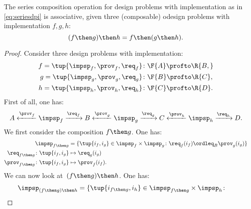 {    \begin{lemma}
        The series composition operation for design problems with implementation as in \cref{eq:seriesdpi} is associative, \ie  given three (composable) odesign problems with implementation $f,g,h$:
        \begin{equation}
        (f\then g)
            \then h = f\then (g\then h).
        \end{equation}
    \end{lemma}
    \begin{proof}
        Consider three design problems with implementation:
        \begin{equation}
            \begin{aligned}
                f=\tup{{\impsp_f, \prov_f, \req_f} }&\colon \F{A} \profto\R{B,}\\
                g=\tup{\impsp_g, \prov_g, \req_g}&\colon \F{B} \profto \R{C},\\
                h=\tup{\impsp_h, \prov_h, \req_h}&\colon \F{C} \profto \R{D}.
            \end{aligned}
        \end{equation}
        First of all, one has:
        \begin{equation}
            A \xleftarrow{\prov_f} \impsp_f \xrightarrow{\req_f} B
            \xleftarrow{\prov_g} \impsp_g \xrightarrow{\req_g} C
            \xleftarrow{\prov_h} \impsp_h \xrightarrow{\req_h} D.
        \end{equation}
        We first consider the composition $f\then g$. One has:
        \begin{equation}
            \begin{aligned}
                \impsp_{f\then g} &= \{
                \tup{i_f,i_g} \in \impsp_f \times \impsp_g \colon
                \req_f(i_f) \ordleq_{B} \prov_g(i_g)
                \}\\
                \req_{f\then g}  \colon  \tup{i_f,i_g} &\mapsto \req_g(i_g) \\
                \prov_{f\then g}  \colon  \tup{i_f,i_g} &\mapsto \prov_f(i_f).
            \end{aligned}
        \end{equation}
        We can now look at~$(f\then g)\then h$. One has:
        \begin{equation}
            \begin{aligned}
                &\impsp_{(f\then g)\then h} = \{
                \tup{i_{f\then g},i_h} \in \impsp_{f\then g} \times \impsp_{h}\colon

\end{aligned}
\end{equation}
\end{proof}}
